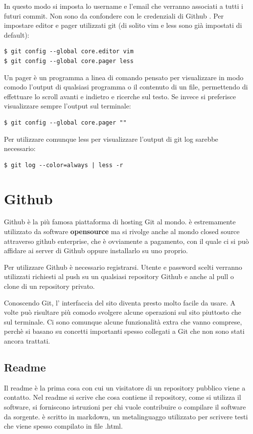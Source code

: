 \documentclass{article}
\begin{document}
In questo modo si imposta lo username e l'email che verranno associati a tutti i
futuri commit. Non sono da confondere con le credenziali di Github .
Per impostare editor e pager utilizzati git (di solito vim e less sono già 
impostati di default):

\begin{verbatim}
$ git config --global core.editor vim
$ git config --global core.pager less
\end{verbatim}

Un pager è un programma a linea di comando pensato per visualizzare in modo comodo
l'output di qualsiasi programma o il contenuto di un file, permettendo di
effettuare lo scroll avanti e indietro e ricerche sul testo.
Se invece si preferisce visualizzare sempre l'output sul terminale:

\begin{verbatim}
$ git config --global core.pager ""
\end{verbatim}

Per utilizzare comunque less per visualizzare l'output di git log sarebbe
necessario:

\begin{verbatim}
$ git log --color=always | less -r 
\end{verbatim}

\section{Github\label{github}}
Github è la più famosa piattaforma di hosting Git al mondo. è estremamente
utilizzato da software \textbf{opensource} ma si rivolge anche al mondo closed
source attraverso github enterprise, che è ovviamente a pagamento, con il quale
ci si può affidare ai server di Github oppure installarlo su uno proprio.

Per utilizzare Github è necessario registrarsi. Utente e password scelti
verranno utilizzati richiesti al push su un qualsiasi repository Github e anche
al pull o clone di un repository privato.

Conoscendo Git, l' interfaccia del sito diventa presto molto facile da usare.
A volte può risultare più comodo svolgere alcune operazioni sul sito piuttosto
che sul terminale.
Ci sono comunque alcune funzionalità extra che vanno comprese, perchè si basano su
concetti importanti spesso collegati a Git che non sono stati ancora trattati.

\subsection{Readme\label{readme}}
Il readme è la prima cosa con cui un visitatore di un repository pubblico viene
a contatto. Nel readme si scrive che cosa contiene il repository, come si
utilizza il software, si forniscono istruzioni per chi vuole contribuire o 
compilare il software da sorgente.
è scritto in markdown, un metalinguaggo utilizzato per scrivere testi che viene
spesso compilato in file .html.
\end{document}
